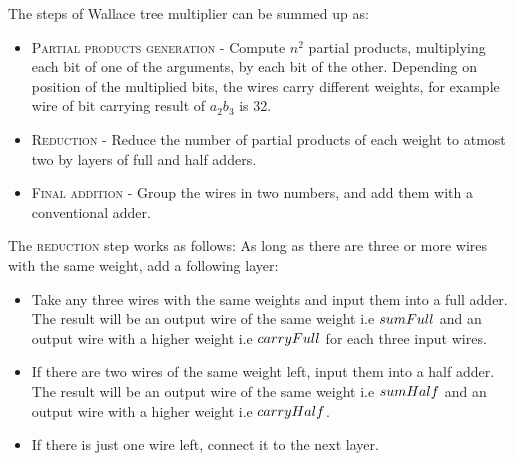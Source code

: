 The steps of Wallace tree multiplier can be summed up as:

\begin{itemize}

\item \textsc{Partial products generation} - Compute $n^2$ partial products, multiplying each bit of one of the arguments, by each bit of the other. Depending on position of the multiplied bits, the wires carry different weights, for example wire of bit carrying result of $a_{2}b_{3}$ is 32.
\item \textsc{Reduction} - Reduce the number of partial products of each weight to atmost two by layers of full and half adders.
\item \textsc{Final addition} - Group the wires in two numbers, and add them with a conventional adder.

\end{itemize}

The \textsc{reduction} step works as follows: As long as there are three or more wires with the same weight, add a following layer:

\begin{itemize}

\item Take any three wires with the same weights and input them into a full adder. The result will be an output wire of the same weight i.e $sumFull$ and an output wire with a higher weight i.e $carryFull$ for each three input wires.
\item If there are two wires of the same weight left, input them into a half adder. The result will be an output wire of the same weight i.e $sumHalf$ and an output wire with a higher weight i.e $carryHalf$.
\item If there is just one wire left, connect it to the next layer.
\end{itemize}


